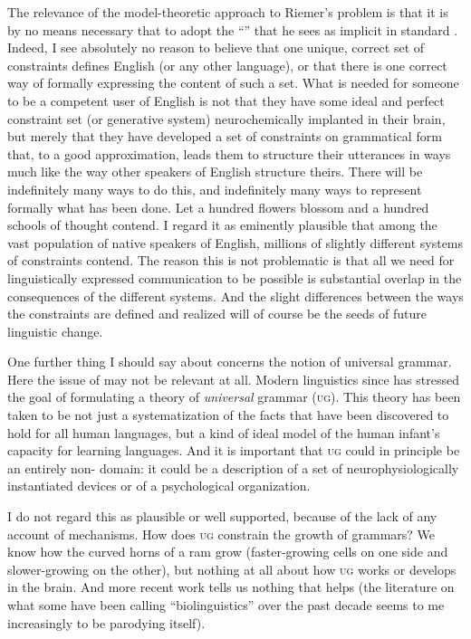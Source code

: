 \documentclass[output=paper]{langscibook}
\begin{document}
The relevance of the model-theoretic approach to Riemer's problem is that it is by no means necessary that to adopt the ``'' that he sees as implicit in standard . Indeed, I see absolutely no reason to believe that one unique, correct set of constraints defines English (or any other language), or that there is one correct way of formally expressing the content of such a set. What is needed for someone to be a competent user of English is not that they have some ideal and perfect constraint set (or generative system) neurochemically implanted in their brain, but merely that they have developed a set of constraints on grammatical form that, to a good approximation, leads them to structure their utterances in ways much like the way other speakers of English structure theirs. There will be indefinitely many ways to do this, and indefinitely many ways to represent formally what has been done. Let a hundred flowers blossom and a hundred schools of thought contend. I regard it as eminently plausible that among the vast population of native speakers of English, millions of slightly different systems of constraints contend. The reason this is not problematic is that all we need for linguistically expressed communication to be possible is substantial overlap in the consequences of the different systems. And the slight differences between the ways the constraints are defined and realized will of course be the seeds of future linguistic change.

One further thing I should say about  concerns the notion of universal grammar. Here the issue of  may not be relevant at all. Modern linguistics since \citet{Chomsky65} has stressed the goal of formulating a theory of \emph{universal} grammar (\textsc{ug}).  This theory has been taken to be not just a systematization of the facts that have been discovered to hold for all human languages, but a kind of ideal model of the human infant's capacity for learning languages.  And it is important that \textsc{ug} could in principle be an entirely non- domain: it could be a description of a set of neurophysiologically instantiated devices or of a psychological organization.

I do not regard this as plausible or well supported, because of the lack of any account of mechanisms.  How does \textsc{ug} constrain the growth of grammars? We know how the curved horns of a ram grow (faster-growing cells on one side and slower-growing on the other), but nothing at all about how \textsc{ug} works or develops in the brain. And more recent work tells us nothing that helps (the literature on what some have been calling ``biolinguistics'' over the past decade seems to me increasingly to be parodying itself).
\end{document}
